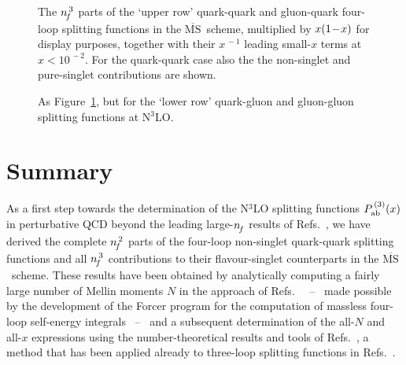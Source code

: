\documentclass[12pt]{article}
\newcommand{\MSb}{$\overline{\mbox{MS}}$}
\begin{document}
\begin{figure}[p]
\vspace{-4mm}
\centerline{}
\vspace{-2mm}
\caption{ \label{fig:prow1nf3} \small
 The ${n^{\,3}_{\! f}}$ parts of the `upper row' quark-quark and gluon-quark four-loop 
 splitting functions in the \MSb\ scheme, multiplied by $x\x1$ for display 
 purposes, together with their $x^{\,-1}$ leading small-$x$ terms at 
 $x < 10^{\,-2}$. For the quark-quark case also the the non-singlet and 
 pure-singlet contributions are shown.}
\vspace{-1mm}
\end{figure}
%
\begin{figure}[p]
\vspace{-2mm}
\centerline{}
\vspace{-2mm}
\caption{ \label{fig:prow2nf3} \small
 As Figure~\ref{fig:prow1nf3}, but for the `lower row' quark-gluon 
 and gluon-gluon splitting functions at N$^3$LO.}
\vspace{-1mm}
\end{figure}

\newpage
 
%
\section{Summary}
\label{sec:summ}
%

As a first step towards the determination of the N$^3$LO splitting functions 
$P_{\rm ab}^{\,(3)}(x)$ in perturbative QCD beyond the leading large-${n^{}_{\! f}}$ 
results of Refs.~\cite{LargeNf1,LargeNf2,LargeNf3}, 
we have derived the complete ${n^{\,2}_{\! f}}$ parts of the four-loop non-singlet 
quark-quark splitting functions and all ${n^{\,3}_{\! f}}$ contributions to their 
flavour-singlet counterparts in the \MSb\ scheme.
These results have been obtained by analytically computing a fairly large
number of Mellin moments $N$ in the approach of 
Refs.~\cite{Mom3loop1,Mom3loop2,Mom3loop3} ~--~
made possible by the development of the {\sc Forcer} program 
\cite{tuLL2016,FORCER} for the computation of massless four-loop self-energy 
integrals ~--~ and a subsequent determination of the all-$N$ and all-$x$
expressions using the number-theoretical results and tools of 
Refs.~\cite{LLL,axbAlg,Calc}, a method that has been applied already 
to three-loop splitting functions in Refs.~\cite{VelizTrv,mvvDP2}.
\end{document}
